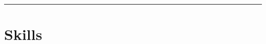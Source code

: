 \documentclass[]{resume-openfont}
\newcommand{\projectHeading}[3]{\Project{#1}{#2}
\descript{#3}\\}
\newcommand{\projectHeadingWithoutLink}[2]{
\runsubsection{%
{\uppercase{#1}}
}
    \hfill
    \descript{#2}\\
}
\begin{document}



\hrule


\section{Skills}
\end{document}
